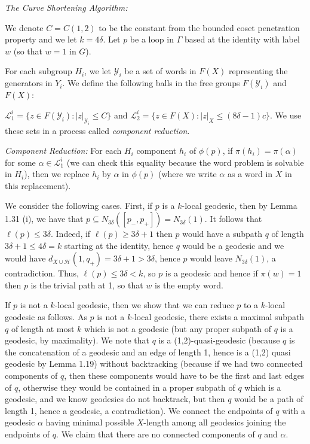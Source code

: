 \documentclass[12pt]{article}
\newcommand{\vs}{\vskip10pt}
\begin{document}
	\vs 
	
	\textit{The Curve Shortening Algorithm: } 
	
	\vs 
	
	We denote $C = C(1,2)$ to be the constant from the bounded coset penetration property and we let $k = 4\delta$. Let $p$ be a loop in $\Gamma$ based at the identity with label $w$ (so that $w = 1$ in $G$). 
	
	\vs 
	
	For each subgroup $H_i$, we let $\mathcal{Y}_i$ be a set of words in $F(X)$ representing the generators in $Y_i$. We define the following balls in the free groups $F(\mathcal{Y}_i)$ and $F(X)$: 
	
	\vs 
	
	$\mathcal{L}_1^i = \{z \in F(\mathcal{Y}_i): \vert z \vert_{\mathcal{Y}_i} \leq C\}$ and $\mathcal{L}_2^i = \{z \in F(X): \vert z \vert_X \leq (8 \delta-1)c\}$. We use these sets in a process called \textit{component reduction}. 
	
	\vs 
	
	\textit{Component Reduction: } For each $H_i$ component $h_i$ of $\phi(p)$, if $\pi(h_i) = \pi(\alpha)$ for some $\alpha \in \mathcal{L}_1^i$ (we can check this equality because the word problem is solvable in $H_i$), then we replace $h_i$ by $\alpha$ in $\phi(p)$ (where we write $\alpha$ as a word in $X$ in this replacement).  
	
	\vs 
	
	We consider the following cases. First, if $p$ is a $k$-local geodesic, then by Lemma 1.31 (i), we have that $p \subseteq N_{3 \delta}([p_-, p_+]) = N_{3 \delta}(1)$. It follows that $\ell(p) \leq 3 \delta$. Indeed, if $\ell(p) \geq 3 \delta + 1$ then $p$ would have a subpath $q$ of length $3 \delta + 1 \leq 4 \delta = k$ starting at the identity, hence $q$ would be a geodesic and we would have $d_{X \cup \mathcal{H}}(1, q_+) = 3 \delta + 1 > 3 \delta$, hence $p$ would leave $N_{3 \delta}(1)$, a contradiction. Thus, $\ell(p) \leq 3 \delta < k$, so $p$ is a geodesic and hence if $\pi(w) = 1$ then $p$ is the trivial path at 1, so that $w$ is the empty word. 
	
	\vs 
	
	If $p$ is not a $k$-local geodesic, then we show that we can reduce $p$ to a $k$-local geodesic as follows. As $p$ is not a $k$-local geodesic, there exists a maximal subpath $q$ of length at most $k$ which is not a geodesic (but any proper subpath of $q$ is a geodesic, by maximality). We note that $q$ is a (1,2)-quasi-geodesic (because $q$ is the concatenation of a geodesic and an edge of length 1, hence is a (1,2) quasi geodesic by Lemma 1.19) without backtracking (because if we had two connected components of $q$, then these components would have to be the first and last edges of $q$, otherwise they would be contained in a proper subpath of $q$ which is a geodesic, and we know geodesics do not backtrack, but then $q$ would be a path of length 1, hence a geodesic, a contradiction). We connect the endpoints of $q$ with a geodesic $\alpha$ having minimal possible $X$-length among all geodesics joining the endpoints of $q$. We claim that there are no connected components of $q$ and $\alpha$. 
	
\end{document}
